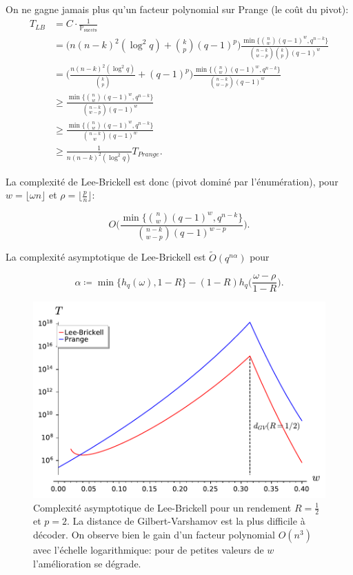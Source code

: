 \documentclass{scrartcl}[a4paper,9pt,headings=small,footinclude=false]
\theoremstyle{definition}
\theoremstyle{remark}
\begin{document}
On ne gagne jamais plus qu'un facteur polynomial sur Prange (le coût du pivot):
\begin{align*}
T_{LB} &= C\cdot \frac{1}{\mathbb{P}_{\text{succès}}}\\
&=\Bigg(n(n-k)^2(\log^2 q) + \binom{k}{p}(q-1)^p\Bigg)  \frac{\min \{ \binom{n}{w}(q-1)^w, q^{n-k}\}}{\binom{n-k}{w-p} \binom{k}{p}(q-1)^w}\\
&=\Bigg(\frac{n(n-k)^2(\log^2 q)}{\binom{k}{p}} +(q-1)^p\Bigg)  \frac{\min \{ \binom{n}{w}(q-1)^w, q^{n-k}\}}{\binom{n-k}{w-p} (q-1)^w}\\
&\geq \frac{\min \{ \binom{n}{w}(q-1)^w, q^{n-k}\}}{\binom{n-k}{w-p} (q-1)^w}\\
&\geq \frac{\min \{ \binom{n}{w}(q-1)^w, q^{n-k}\}}{\binom{n-k}{w} (q-1)^w}\\
&\geq \frac{1}{n(n-k)^2(\log^2 q)} T_{Prange}.
\end{align*}

La complexité de Lee-Brickell est donc (pivot dominé par l'énumération), pour $w=\lfloor \omega n \rfloor$ et $\rho=\lfloor \frac{p}{n} \rfloor$:

\[
	O\Bigg(\frac{\min \{ \binom{n}{w}(q-1)^w, q^{n-k}\}}{\binom{n-k}{w-p} (q-1)^{w-p}}\Bigg).
\]

La complexité asymptotique de Lee-Brickell est $\tilde{O}(q^{n\alpha})$ pour

\[
\alpha \coloneq \min\{ h_q(\omega), 1-R \} - (1-R) h_q\bigg(\frac{\omega - \rho}{1-R}\bigg).
\]

\begin{figure}[h]
\centering
\includegraphics{decodage_syndrome/LB.pdf}
\caption{Complexité asymptotique de Lee-Brickell pour un rendement $R=\frac{1}{2}$ et $p=2$. La distance de Gilbert-Varshamov est la plus difficile à décoder. On observe bien le gain d'un facteur polynomial $O(n^3)$ avec l'échelle logarithmique: pour de petites valeurs de $w$ l'amélioration se dégrade.}
\label{fig:prange}
\end{figure}
\end{document}
